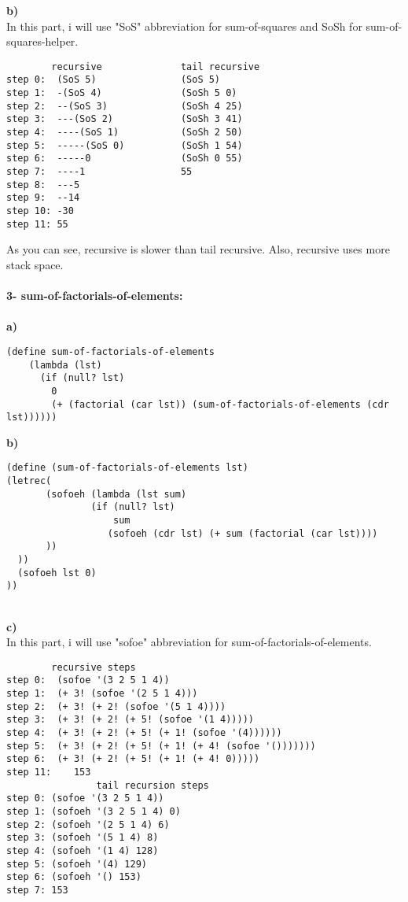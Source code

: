 \documentclass[11pt]{article}
\begin{document}
{\bf b)}\\
In this part, i will use "SoS" abbreviation for sum-of-squares and SoSh for sum-of-squares-helper.
\begin{lstlisting}
		recursive              tail recursive
step 0:	 (SoS 5)               (SoS 5)
step 1:	 -(SoS 4)              (SoSh 5 0)
step 2:	 --(SoS 3)             (SoSh 4 25)
step 3:	 ---(SoS 2)            (SoSh 3 41)
step 4:	 ----(SoS 1)           (SoSh 2 50)
step 5:	 -----(SoS 0)          (SoSh 1 54)
step 6:	 -----0                (SoSh 0 55)
step 7:	 ----1                 55
step 8:	 ---5
step 9:	 --14
step 10: -30
step 11: 55
\end{lstlisting}
As you can see, recursive is slower than tail recursive. Also, recursive uses more stack space.
\\~\\
{\bf 3- sum-of-factorials-of-elements:}\\~\\
{\bf a)}\\
\begin{lstlisting}
(define sum-of-factorials-of-elements
    (lambda (lst)
      (if (null? lst)
        0
        (+ (factorial (car lst)) (sum-of-factorials-of-elements (cdr lst))))))
\end{lstlisting}
{\bf b)}\\
\begin{lstlisting}
(define (sum-of-factorials-of-elements lst)
(letrec(
       (sofoeh (lambda (lst sum)
               (if (null? lst)
                   sum
                  (sofoeh (cdr lst) (+ sum (factorial (car lst))))
       ))
  ))
  (sofoeh lst 0)
))
\end{lstlisting}
\newpage~\\
{\bf c)}\\
In this part, i will use "sofoe" abbreviation for sum-of-factorials-of-elements.
\begin{lstlisting}
		recursive steps
step 0:	 (sofoe '(3 2 5 1 4))
step 1:	 (+ 3! (sofoe '(2 5 1 4)))
step 2:	 (+ 3! (+ 2! (sofoe '(5 1 4))))
step 3:	 (+ 3! (+ 2! (+ 5! (sofoe '(1 4)))))
step 4:	 (+ 3! (+ 2! (+ 5! (+ 1! (sofoe '(4))))))
step 5:	 (+ 3! (+ 2! (+ 5! (+ 1! (+ 4! (sofoe '()))))))
step 6:	 (+ 3! (+ 2! (+ 5! (+ 1! (+ 4! 0)))))
step 11:    153
                tail recursion steps
step 0:	(sofoe '(3 2 5 1 4))
step 1:	(sofoeh '(3 2 5 1 4) 0)
step 2:	(sofoeh '(2 5 1 4) 6)
step 3:	(sofoeh '(5 1 4) 8)
step 4:	(sofoeh '(1 4) 128)
step 5:	(sofoeh '(4) 129)
step 6:	(sofoeh '() 153)
step 7:	153
\end{lstlisting}
\end{document}
